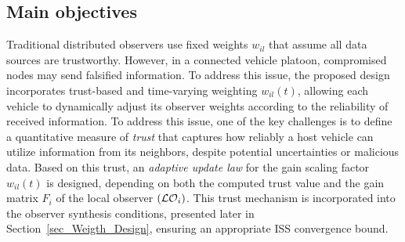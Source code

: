 \subsection{Main objectives}
\vspace*{-0.3cm}
Traditional distributed observers use fixed weights $w_{i l}$ that assume all data sources are trustworthy. However, in a connected vehicle platoon, compromised nodes may send falsified information. To address this issue, the proposed design incorporates trust-based and time-varying weighting $w_{i l}(t)$, allowing each vehicle to dynamically adjust its observer weights according to the reliability of received information. To address this issue, one of the key challenges is to define a quantitative measure of \emph{trust} that captures how reliably a host vehicle can utilize information from its neighbors, despite potential uncertainties or malicious data. Based on this trust, an \emph{adaptive update law} for the gain scaling factor $w_{il}(t)$ is designed, depending on both the computed trust value and the gain matrix $F_i$ of the local observer $(\mathcal{LO}_i)$. This trust mechanism is incorporated into the observer synthesis conditions, presented later in Section~\ref{sec_Weigth_Design}, ensuring an appropriate ISS convergence bound.




